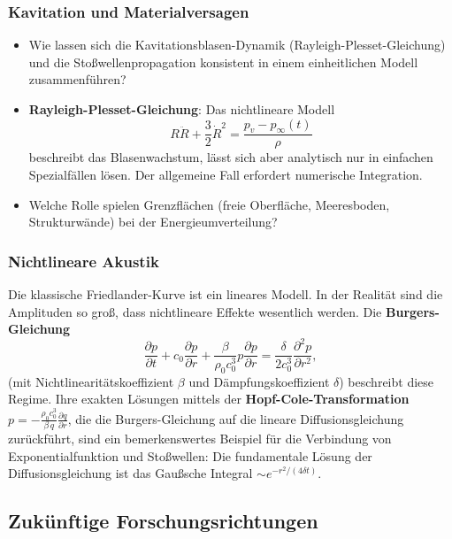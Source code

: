﻿\documentclass[12pt,a4paper]{article}
\theoremstyle{definition}
\theoremstyle{remark}
\begin{document}
\subsubsection{Kavitation und Materialversagen}

\begin{itemize}
\item Wie lassen sich die Kavitationsblasen-Dynamik (Rayleigh-Plesset-Gleichung) und die Stoßwellenpropagation konsistent in einem einheitlichen Modell zusammenführen?
\item \textbf{Rayleigh-Plesset-Gleichung}: Das nichtlineare Modell
\begin{equation}
R\ddot{R} + \frac{3}{2}\dot{R}^2 = \frac{p_v - p_\infty(t)}{\rho}
\end{equation}
beschreibt das Blasenwachstum, lässt sich aber analytisch nur in einfachen Spezialfällen lösen. Der allgemeine Fall erfordert numerische Integration.
\item Welche Rolle spielen Grenzflächen (freie Oberfläche, Meeresboden, Strukturwände) bei der Energieumverteilung?
\end{itemize}

\subsubsection{Nichtlineare Akustik}

Die klassische Friedlander-Kurve ist ein lineares Modell. In der Realität sind die Amplituden so groß, dass nichtlineare Effekte wesentlich werden. Die \textbf{Burgers-Gleichung}
\begin{equation}
\frac{\partial p}{\partial t} + c_0 \frac{\partial p}{\partial r} + \frac{\beta}{\rho_0 c_0^3} p\frac{\partial p}{\partial r} = \frac{\delta}{2c_0^3}\frac{\partial^2 p}{\partial r^2},
\end{equation}
(mit Nichtlinearitätskoeffizient $\beta$ und Dämpfungskoeffizient $\delta$) beschreibt diese Regime. Ihre exakten Lösungen mittels der \textbf{Hopf-Cole-Transformation} $p = -\frac{\rho_0 c_0^3}{\beta\,q}\frac{\partial q}{\partial r}$, die die Burgers-Gleichung auf die lineare Diffusionsgleichung zurückführt, sind ein bemerkenswertes Beispiel für die Verbindung von Exponentialfunktion und Stoßwellen: Die fundamentale Lösung der Diffusionsgleichung ist das Gaußsche Integral $\sim e^{-r^2/(4\delta t)}$.

\subsection{Zukünftige Forschungsrichtungen}
\end{document}
